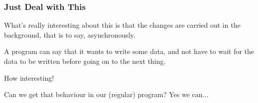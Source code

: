 \begin{frame}
	\frametitle{Just Deal with This}

	What's really interesting about this is that the changes are carried out in the background, that is to say, asynchronously.

	A program can say that it wants to write some data, and not have to wait for the data to be written before going on to the next thing.

	How interesting!

	Can we get that behaviour in our (regular) program? Yes we can...


\end{frame}






